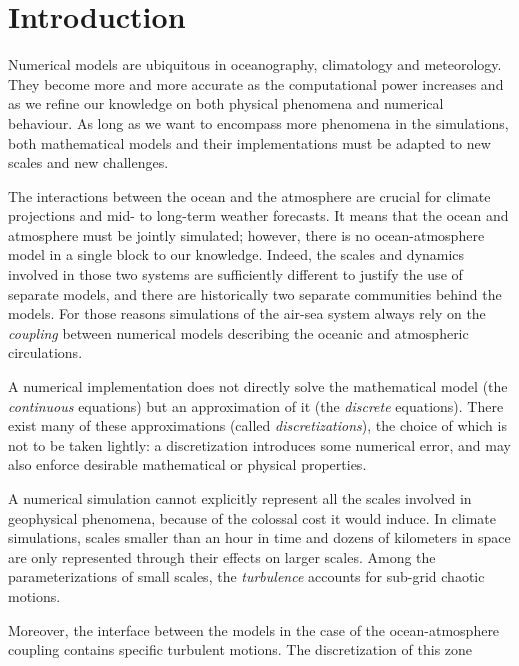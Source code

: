 \chapter*{Introduction}
\label{ch:introduction}
Numerical models are ubiquitous in oceanography, climatology and
meteorology. They become more and more accurate as the
computational power increases and as we refine our knowledge on
both physical phenomena and numerical behaviour.
As long as we want to encompass more phenomena in the simulations,
both mathematical models and their implementations must be
adapted to new scales and new challenges.
\par %
The interactions between the ocean and the atmosphere are crucial
for climate projections and mid- to long-term weather forecasts.
It means that the ocean and atmosphere must be jointly simulated;
however, there is no ocean-atmosphere model in a single
block to our knowledge.
Indeed, the scales and dynamics involved in those two systems are
sufficiently different to justify the use of separate models,
and there are historically two separate communities behind the
models. For those reasons simulations of the air-sea system
always rely on the \textit{coupling} between numerical models describing
the oceanic and atmospheric circulations.
\par %
A numerical implementation does not directly solve the mathematical
model (the \textit{continuous} equations) but an approximation of it
(the \textit{discrete} equations). There exist many of these
approximations (called \textit{discretizations}), the choice of which
is not to be taken lightly: a discretization introduces some
numerical error, and may also enforce desirable mathematical
or physical properties.
\par
A numerical simulation cannot explicitly represent all the
scales involved in geophysical phenomena, because of the
colossal cost it would induce. In climate simulations,
scales smaller than an hour in time
and dozens of kilometers in space are only represented
through their effects on larger scales.
Among the parameterizations of small scales, the \textit{turbulence}
accounts for sub-grid chaotic motions.
\par %
Moreover, the interface between the models in the case of
the ocean-atmosphere coupling contains
specific turbulent motions. The discretization of this zone

